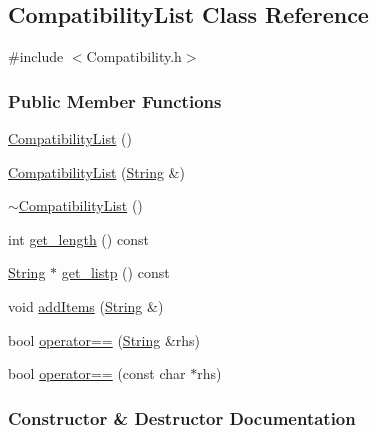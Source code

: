 \subsection{Compatibility\+List Class Reference}
\label{class_compatibility_list}


{\ttfamily \#include $<$Compatibility.\+h$>$}

\subsubsection*{Public Member Functions}
\begin{DoxyCompactItemize}
\item 
\mbox{\hyperlink{class_compatibility_list_a077f7dc792a5419fbd9a0d105133cfbd}{Compatibility\+List}} ()
\item 
\mbox{\hyperlink{class_compatibility_list_af34d724919febac11f933a4d42f3d550}{Compatibility\+List}} (\mbox{\hyperlink{class_string}{String}} \&)
\item 
\mbox{\hyperlink{class_compatibility_list_ac3f2eebda805a5b587c498a4915161fc}{$\sim$\+Compatibility\+List}} ()
\item 
int \mbox{\hyperlink{class_compatibility_list_a44d0f7533b66ced7a957f2846e76c4ec}{get\+\_\+length}} () const
\item 
\mbox{\hyperlink{class_string}{String}} $\ast$ \mbox{\hyperlink{class_compatibility_list_a16642e17369c398c67b04f549f2f77ac}{get\+\_\+listp}} () const
\item 
void \mbox{\hyperlink{class_compatibility_list_a7d9dbeada758ed1fc4849d77058ff69d}{add\+Items}} (\mbox{\hyperlink{class_string}{String}} \&)
\item 
bool \mbox{\hyperlink{class_compatibility_list_a3836f2aaefc1753287dd4d6052e17469}{operator==}} (\mbox{\hyperlink{class_string}{String}} \&rhs)
\item 
bool \mbox{\hyperlink{class_compatibility_list_ad476ceb7026c6316112d5f11b283357e}{operator==}} (const char $\ast$rhs)
\end{DoxyCompactItemize}


\subsubsection{Constructor \& Destructor Documentation}
\mbox{\label{class_compatibility_list_a077f7dc792a5419fbd9a0d105133cfbd}} 
